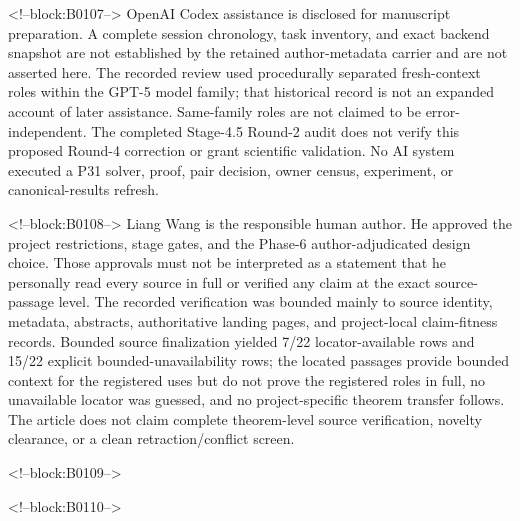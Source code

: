 \documentclass[11pt]{article}
\begin{document}
<!--block:B0107-->
OpenAI Codex assistance is disclosed for manuscript preparation. A complete
session chronology, task inventory, and exact backend snapshot are not
established by the retained author-metadata carrier and are not asserted here.
The recorded review used procedurally separated fresh-context roles within the
GPT-5 model family; that historical record is not an expanded account of later
assistance. Same-family roles are not claimed to be error-independent. The
completed Stage-4.5 Round-2 audit does not verify this proposed Round-4
correction or grant scientific validation. No AI system executed a P31 solver,
proof, pair decision, owner census, experiment, or canonical-results refresh.

<!--block:B0108-->
Liang Wang is the responsible human author. He approved the project
restrictions, stage gates, and the Phase-6 author-adjudicated design
choice. Those approvals must not be interpreted as a statement that he
personally read every source in full or verified any claim at the exact
source-passage level. The recorded verification was bounded mainly to
source identity, metadata, abstracts, authoritative landing pages, and
project-local claim-fitness records. Bounded source finalization yielded
7/22 locator-available rows and 15/22 explicit bounded-unavailability rows;
the located passages provide bounded context for the registered uses but do not
prove the registered roles in full, no unavailable locator was guessed, and no
project-specific theorem transfer follows. The
article does not claim complete theorem-level source verification, novelty
clearance, or a clean retraction/conflict screen.

<!--block:B0109-->



<!--block:B0110-->
\end{document}
